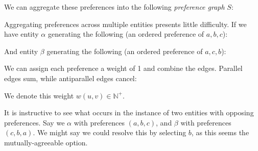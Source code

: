 We can aggregate these preferences into the following \textit{preference graph} $S$:

\begin{center}
\end{center}

Aggregating preferences across multiple entities presents little difficulty.
If we have entity $\alpha$ generating the following (an ordered preference of $a, b, c$):

\begin{center}




\end{center}

And entity $\beta$ generating the following (an ordered preference of $a, c, b$):

\begin{center}




\end{center}


We can assign each preference a weight of 1 and combine the edges.
Parallel edges sum, while antiparallel edges cancel:

\begin{center}
\end{center}

We denote this weight $w(u,v) \in \mathbb{N}^+$.

It is instructive to see what occurs in the instance of two entities with opposing preferences.
Say we $\alpha$ with preferences $(a, b, c)$, and $\beta$ with preferences $(c, b, a)$.
We might say we could resolve this by selecting $b$, as this seems the mutually-agreeable option.

